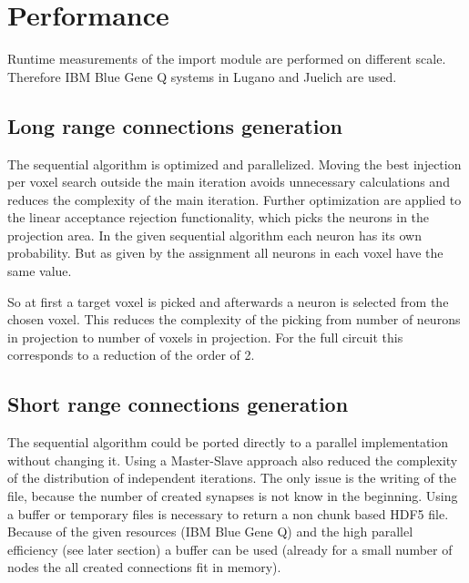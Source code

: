 \section{Performance}
Runtime measurements of the import module are performed on different scale.
Therefore IBM Blue Gene Q systems in Lugano and Juelich are used.

\subsection{Long range connections generation}
The sequential algorithm is optimized and parallelized. Moving the best injection per voxel search outside the main iteration
avoids unnecessary calculations and reduces the complexity of the main iteration. Further optimization are applied
to the linear acceptance rejection functionality, which picks the neurons in the projection area.
In the given sequential algorithm each neuron has its own probability.
But as given by the assignment all neurons in each voxel have the same value.

So at first a target voxel is picked and afterwards a neuron is selected from the chosen voxel.
This reduces the complexity of the picking from number of neurons in projection to number of voxels in projection.
For the full circuit this corresponds to a reduction of the order of 2.


\subsection{Short range connections generation}
The sequential algorithm could be ported directly to a parallel implementation without changing it.
Using a Master-Slave approach also reduced the complexity of the distribution of independent iterations.
The only issue is the writing of the file, because the number of created synapses is not know in the beginning.
Using a buffer or temporary files is necessary to return a non chunk based HDF5 file.
Because of the given resources (IBM Blue Gene Q) and the high parallel efficiency (see later section)
a buffer can be used (already for a small number of nodes the all created connections fit in memory).

